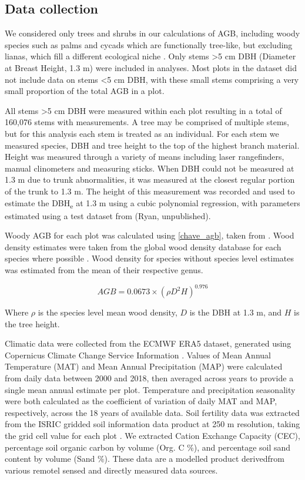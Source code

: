 \documentclass[11pt,a4paper]{article}
\begin{document}
\subsection{Data collection}
 
We considered only trees and shrubs in our calculations of AGB, including woody species such as palms and cycads which are functionally tree-like, but excluding lianas, which fill a different ecological niche \citep{Selaya2008}. Only stems >5 cm DBH (Diameter at Breast Height, 1.3 m) were included in analyses. Most plots in the dataset did not include data on stems <5 cm DBH, with these small stems comprising a very small proportion of the total AGB in a plot. 


All stems >5 cm DBH were measured within each plot resulting in a total of 160,076 stems with measurements. A tree may be comprised of multiple stems, but for this analysis each stem is treated as an individual. For each stem we measured species, DBH and tree height to the top of the highest branch material. Height was measured through a variety of means including laser rangefinders, manual clinometers and measuring sticks. When DBH could not be measured at 1.3 m due to trunk abnormalities, it was measured at the closest regular portion of the trunk to 1.3 m. The height of this measurement was recorded and used to estimate the DBH\textsubscript{e} at 1.3 m using a cubic polynomial regression, with parameters estimated using a test dataset from (Ryan, unpublished).

Woody AGB for each plot was calculated using \autoref{chave_agb}, taken from \citet{Chave2014}. Wood density estimates were taken from the global wood density database for each species where possible \citep{Chave2009, Zanne2009}. Wood density for species without species level estimates was estimated from the mean of their respective genus. 

\begin{equation}
	AGB = 0.0673 \times (\rho D^{2} H)^{0.976}
	\label{chave_agb}
\end{equation}

Where $\rho$ is the species level mean wood density, $D$ is the DBH at 1.3 m, and $H$ is the tree height.

Climatic data were collected from the ECMWF ERA5 dataset, generated using Copernicus Climate Change Service Information \citep{ERA5}. Values of Mean Annual Temperature (MAT) and Mean Annual Precipitation (MAP) were calculated from daily data between 2000 and 2018, then averaged across years to provide a single mean annual estimate per plot. Temperature and precipitation seasonality were both calculated as the coefficient of variation of daily MAT and MAP, respectively, across the 18 years of available data. Soil fertility data was extracted from the ISRIC gridded soil information data product at 250 m resolution, taking the grid cell value for each plot \citep{Hengl2017}. We extracted Cation Exchange Capacity (CEC), percentage soil organic carbon by volume (Org. C \%), and percentage soil sand content by volume (Sand \%). These data are a modelled product derivedfrom various remotel sensed and directly measured data sources. 
\end{document}

